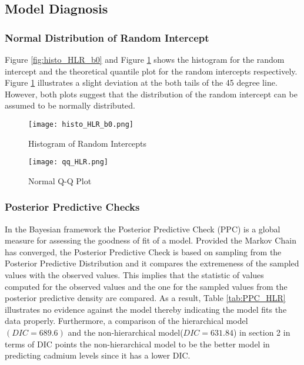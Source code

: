 \documentclass[11pt]{article}
\begin{document}
\subsection{Model Diagnosis}
\subsubsection{Normal Distribution of Random Intercept}

Figure \ref{fig:histo_HLR_b0} and Figure \ref{fig:qq_HLR} shows the histogram for the random intercept and the theoretical quantile plot for the random intercepts respectively. Figure \ref{fig:qq_HLR} illustrates a slight deviation at the both tails of the 45 degree line. However, both plots suggest that the distribution of the random intercept can be assumed to be normally distributed.

    \begin{figure}[H]
  \begin{minipage}[b]{0.4\textwidth}
    \texttt{[image: histo\_HLR\_b0.png]}
    \caption{Histogram of Random Intercepts}
    \label{fig:histo_HLR_b0}
  \end{minipage}
  \hfill
  \begin{minipage}[b]{0.45\textwidth}
    \texttt{[image: qq\_HLR.png]}
    \caption{Normal Q-Q Plot}
    \label{fig:qq_HLR}
  \end{minipage}

\end{figure}

\subsubsection{Posterior Predictive Checks}
\noindent In the Bayesian framework the Posterior Predictive Check (PPC) is a global measure for assessing the goodness of fit of a model. Provided the Markov Chain has converged, the Posterior Predictive Check is based on sampling from the  Posterior Predictive Distribution and it compares the extremeness of the sampled values with the observed values. This implies that the statistic of values computed for the observed values and the one for the sampled values from the posterior predictive density are compared. As a result, Table \ref{tab:PPC_HLR} illustrates no evidence against the model thereby indicating the model fits the data properly. Furthermore, a comparison of the hierarchical model $(DIC = 689.6)$ and the non-hierarchical model($DIC=631.84$) in section 2 in terms of DIC points the non-hierarchical model to be the better model in predicting cadmium levels since it has a lower DIC.  
\end{document}
